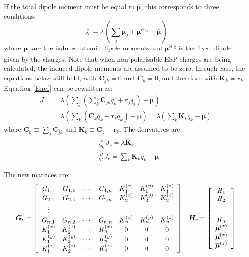 \documentclass[a4paper]{report}
\newcommand{\bs}{\boldsymbol}
\newcommand{\mr}{\mathrm}
\begin{document}
If the total dipole moment must be equal to $\overline{\bs{\mu}}$, this corresponds
to three conditions:
\begin{equation}
J_\mr{c} = \lambda \left(\sum_j \bs{\mu}_j + \bs{\mu}^\mr{chg} - \overline{\bs{\mu}}
\right) 
\label{E:ref}
\end{equation}
where $\bs{\mu}_j$ are the induced atomic dipole moments and $\bs{\mu}^\mr{chg}$ is the
fixed dipole given by the charges. Note that when non-polarisable ESP charges are
being calculated, the induced dipole moments are assumed to be zero. In such case,
the equations below still hold, with $\bs{C}_{jk} = 0$ and $\tilde{\bs{C}}_k = 0$,
and therefore with $\bs{K}_k = \bs{r}_k$. Equation \ref{E:ref} can be rewritten as:
\begin{align}
J_\mr{c} =& \lambda \left(\sum_j \left(\sum_k \bs{C}_{jk} q_k + 
\bs{r}_j q_j\right) - \overline{\bs{\mu}} \right) = \nonumber \\
=& \lambda \left(\sum_k \left( \tilde{\bs{C}}_k q_k + \bs{r}_k q_k \right)-
\overline{\bs{\mu}} \right) = \lambda \left(\sum_k \bs{K}_k q_k -
\overline{\bs{\mu}} \right)
\end{align}
where $\tilde{\bs{C}}_k \equiv \sum_j \bs{C}_{jk}$ and $\bs{K}_k \equiv
\tilde{\bs{C}}_k + \bs{r}_k$. The derivatives are:
\begin{align}
&\frac{\partial}{\partial q_x} J_\mr{c} = \lambda \bs{K}_x \\
&\frac{\partial}{\partial \lambda} J_\mr{c} = \sum_k \bs{K}_k q_k -
\overline{\bs{\mu}}
\end{align}

The new matrices are:
\begin{equation}
\bs{G}_c = \left[ \begin{array}{ccccccccr} 
G_{1,1}   & G_{1,2}   & \cdots & G_{1,n}   & K_1^{(x)} & K_1^{(y)} & K_1^{(z)} \\
G_{2,1}   & G_{2,2}   & \cdots & G_{2,n}   & K_2^{(x)} & K_2^{(y)} & K_2^{(z)} \\
\vdots \\
G_{n,1}   & G_{n,2}   & \cdots & G_{n,n}   & K_n^{(x)} & K_n^{(y)} & K_n^{(z)} \\
K_1^{(x)} & K_2^{(x)} & \cdots & K_n^{(x)} & 0         & 0         & 0         \\
K_1^{(y)} & K_2^{(y)} & \cdots & K_n^{(y)} & 0         & 0         & 0         \\
K_1^{(z)} & K_2^{(z)} & \cdots & K_n^{(z)} & 0         & 0         & 0         \\
\end{array} \right] \hspace{0.3cm} \bs{H}_\mr{c} = \left[ \begin{array}{c} H_1 \\ H_2
\\ \vdots \\ H_n \\ \overline{\bs{\mu}}^{(x)} \\
\overline{\bs{\mu}}^{(x)} \\ \overline{\bs{\mu}}^{(x)} \end{array}
\right]
\end{equation}
\end{document}
